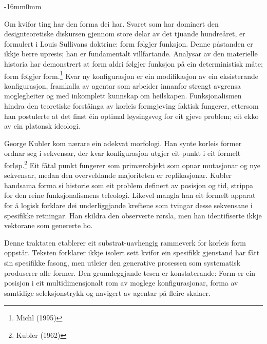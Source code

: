\documentclass[10pt,oneside]{book}
\newcommand{\silentchapter}[2]{%
  \clearpage
  \markboth{#2}{}%
  \addcontentsline{toc}{chapter}{#1}%
}
\newenvironment{widebody}{%
  \begin{adjustwidth}{-16mm}{0mm}%
}{%
  \end{adjustwidth}%
}
\begin{document}
\frontmatter

\thispagestyle{titlepage}
\clearpage

\silentchapter{Føreord}{føreord}
\begin{widebody}
\begingroup\small\setlength{\parskip}{4pt}
Om kvifor ting har den forma dei har. Svaret som har dominert den designteoretiske diskursen gjennom store delar av det tjuande hundreåret, er formulert i Louis Sullivans doktrine: form følgjer funksjon. Denne påstanden er ikkje berre upresis; han er fundamentalt villfartande. Analysar av den materielle historia har demonstrert at form aldri følgjer funksjon på ein deterministisk måte; form følgjer form.\footnote{Michl (1995)} Kvar ny konfigurasjon er ein modifikasjon av ein eksisterande konfigurasjon, framkalla av agentar som arbeider innanfor strengt avgrensa moglegheiter og med inkomplett kunnskap om heilskapen. Funksjonalismen hindra den teoretiske forståinga av korleis formgjeving faktisk fungerer, ettersom han postulerte at det finst éin optimal løysingsveg for eit gjeve problem; eit ekko av ein platonsk ideologi.

George Kubler kom nærare ein adekvat morfologi. Han synte korleis former ordnar seg i sekvensar, der kvar konfigurasjon utgjer eit punkt i eit formelt forløp.\footnote{Kubler (1962)} Eit fåtal punkt fungerer som primærobjekt som opnar mutasjonar og nye sekvensar, medan den overveldande majoriteten er replikasjonar. Kubler handsama forma si historie som eit problem definert av posisjon og tid, strippa for den reine funksjonalismens teleologi. Likevel mangla han eit formelt apparat for å logisk forklare dei underliggjande kreftene som tvingar desse sekvensane i spesifikke retningar. Han skildra den observerte rørsla, men han identifiserte ikkje vektorane som genererte ho.

Denne traktaten etablerer eit substrat-uavhengig rammeverk for korleis form oppstår. Teksten forklarer ikkje isolert sett kvifor ein spesifikk gjenstand har fått sin spesifikke fasong, men utleier den generative prosessen som systematisk produserer alle former. Den grunnleggjande tesen er konstaterande: Form er ein posisjon i eit multidimensjonalt rom av moglege konfigurasjonar, forma av samtidige seleksjonstrykk og navigert av agentar på fleire skalaer.


\end{widebody}
\end{document}
